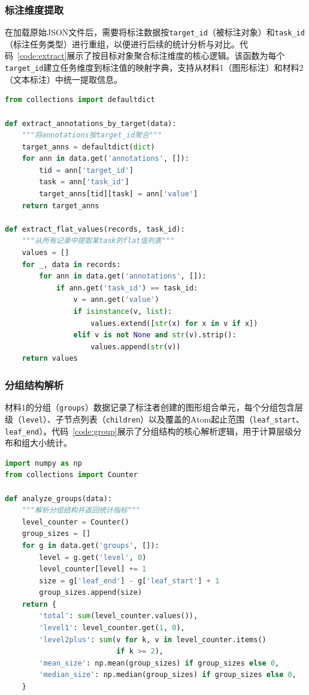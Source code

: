 \documentclass[a4paper,12pt]{article}
\begin{document}
\subsubsection{标注维度提取}

在加载原始JSON文件后，需要将标注数据按\texttt{target\_id}（被标注对象）和\texttt{task\_id}（标注任务类型）进行重组，以便进行后续的统计分析与对比。代码~\ref{code:extract}展示了按目标对象聚合标注维度的核心逻辑。该函数为每个\texttt{target\_id}建立任务维度到标注值的映射字典，支持从材料1（图形标注）和材料2（文本标注）中统一提取信息。

\begin{lstlisting}[language=Python, caption=标注维度按目标对象聚合提取, label=code:extract]
from collections import defaultdict

def extract_annotations_by_target(data):
    """将annotations按target_id聚合"""
    target_anns = defaultdict(dict)
    for ann in data.get('annotations', []):
        tid = ann['target_id']
        task = ann['task_id']
        target_anns[tid][task] = ann['value']
    return target_anns

def extract_flat_values(records, task_id):
    """从所有记录中提取某task的flat值列表"""
    values = []
    for _, data in records:
        for ann in data.get('annotations', []):
            if ann.get('task_id') == task_id:
                v = ann.get('value')
                if isinstance(v, list):
                    values.extend([str(x) for x in v if x])
                elif v is not None and str(v).strip():
                    values.append(str(v))
    return values
\end{lstlisting}

\subsubsection{分组结构解析}

材料1的分组（\texttt{groups}）数据记录了标注者创建的图形组合单元，每个分组包含层级（\texttt{level}）、子节点列表（\texttt{children}）以及覆盖的Atom起止范围（\texttt{leaf\_start}、\texttt{leaf\_end}）。代码~\ref{code:group}展示了分组结构的核心解析逻辑，用于计算层级分布和组大小统计。

\begin{lstlisting}[language=Python, caption=分组结构解析与统计, label=code:group]
import numpy as np
from collections import Counter

def analyze_groups(data):
    """解析分组结构并返回统计指标"""
    level_counter = Counter()
    group_sizes = []
    for g in data.get('groups', []):
        level = g.get('level', 0)
        level_counter[level] += 1
        size = g['leaf_end'] - g['leaf_start'] + 1
        group_sizes.append(size)
    return {
        'total': sum(level_counter.values()),
        'level1': level_counter.get(1, 0),
        'level2plus': sum(v for k, v in level_counter.items() 
                          if k >= 2),
        'mean_size': np.mean(group_sizes) if group_sizes else 0,
        'median_size': np.median(group_sizes) if group_sizes else 0,
    }
\end{lstlisting}
\end{document}
